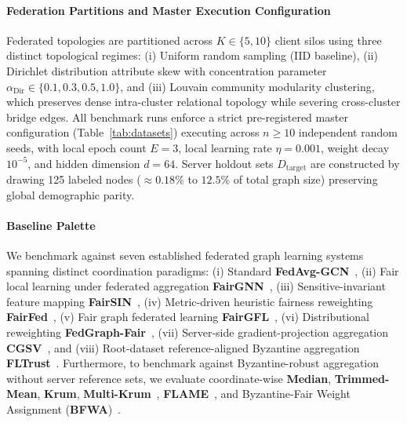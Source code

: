 

\paragraph{Federation Partitions and Master Execution Configuration}
Federated topologies are partitioned across $K \in \{5, 10\}$ client silos using three distinct topological regimes: (i) Uniform random sampling (IID baseline), (ii) Dirichlet distribution attribute skew with concentration parameter $\alpha_{\text{Dir}} \in \{0.1, 0.3, 0.5, 1.0\}$, and (iii) Louvain community modularity clustering, which preserves dense intra-cluster relational topology while severing cross-cluster bridge edges. All benchmark runs enforce a strict pre-registered master configuration (Table~\ref{tab:datasets}) executing across $n \ge 10$ independent random seeds, with local epoch count $E = 3$, local learning rate $\eta = 0.001$, weight decay $10^{-5}$, and hidden dimension $d = 64$. Server holdout sets $D_{\text{target}}$ are constructed by drawing 125 labeled nodes ($\approx 0.18\%$ to $12.5\%$ of total graph size) preserving global demographic parity.

\paragraph{Baseline Palette}
We benchmark against seven established federated graph learning systems spanning distinct coordination paradigms:
(i) Standard \textbf{FedAvg-GCN}~\citep{mcmahan2017communication},
(ii) Fair local learning under federated aggregation \textbf{FairGNN}~\citep{dai2021say},
(iii) Sensitive-invariant feature mapping \textbf{FairSIN}~\citep{yang2024fairsin},
(iv) Metric-driven heuristic fairness reweighting \textbf{FairFed}~\citep{ezzeldin2023fairfed},
(v) Fair graph federated learning \textbf{FairGFL}~\citep{zhou2026fairgfl},
(vi) Distributional reweighting \textbf{FedGraph-Fair}~\citep{khan2026fedgraphfair},
(vii) Server-side gradient-projection aggregation \textbf{CGSV}~\citep{xu2021gradient}, and
(viii) Root-dataset reference-aligned Byzantine aggregation \textbf{FLTrust}~\citep{cao2021fltrust}.
Furthermore, to benchmark against Byzantine-robust aggregation without server reference sets, we evaluate coordinate-wise \textbf{Median}, \textbf{Trimmed-Mean}, \textbf{Krum}, \textbf{Multi-Krum}~\citep{blanchard2017krum}, \textbf{FLAME}~\citep{nguyen2022flame}, and Byzantine-Fair Weight Assignment (\textbf{BFWA})~\citep{dang2026fedfairgnn}.


